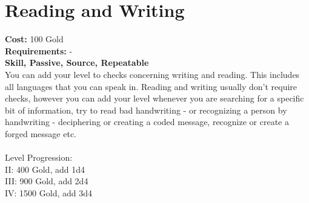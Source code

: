 \section{Reading and Writing}
\textbf{Cost:} 100 Gold\\
\textbf{Requirements:} -\\
\textbf{Skill, Passive, Source, Repeatable}\\
You can add your level to checks concerning writing and reading. This includes all languages that you can speak in. Reading and writing usually don't require checks, however you can add your level whenever you are searching for a specific bit of information, try to read bad handwriting - or recognizing a person by handwriting - deciphering or creating a coded message, recognize or create a forged message etc.\\
\\
Level Progression:\\
II: 400 Gold, add 1d4\\
III: 900 Gold, add 2d4\\
IV: 1500 Gold, add 3d4\\